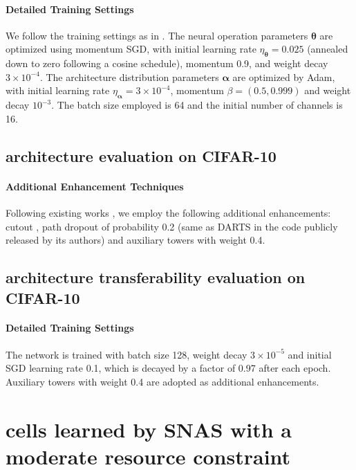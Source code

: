 \documentclass{article} \usepackage{iclr2019_conference,times}
\begin{document}
\paragraph{Detailed Training Settings}

We follow the training settings as in \citet{liu2018darts}. The neural operation parameters $\bm{\theta}$ are optimized using momentum SGD, with initial learning rate $\eta_{\bm{\theta}} = 0.025$ (annealed down to zero following a cosine schedule), momentum 0.9, and weight decay $3 \times 10^{-4}$. The architecture distribution parameters $\bm{\alpha}$ are optimized by Adam, with initial learning rate $\eta_{\bm{\alpha}} = 3 \times 10^{-4}$, momentum $\beta = (0.5, 0.999)$ and weight decay $10^{-3}$. The batch size employed is 64 and the initial number of channels is 16.

\subsection{architecture evaluation on CIFAR-10}

\paragraph{Additional Enhancement Techniques}

Following existing works \citep{zoph2017learning, liu2017progressive, pham2018efficient, real2018regularized, liu2018darts}, we employ the following additional enhancements: cutout \citep{devries2017improved}, path dropout of probability 0.2 (same as DARTS in the code publicly released by its authors) and auxiliary towers with weight 0.4.

\subsection{architecture transferability evaluation on CIFAR-10}

\paragraph{Detailed Training Settings}

The network is trained with batch size 128, weight decay $3\times 10^{-5}$ and initial SGD learning rate 0.1, which is decayed by a factor of 0.97 after each epoch. Auxiliary towers with weight 0.4 are adopted as additional enhancements.

\section{cells learned by SNAS with a moderate resource constraint}
\end{document}
